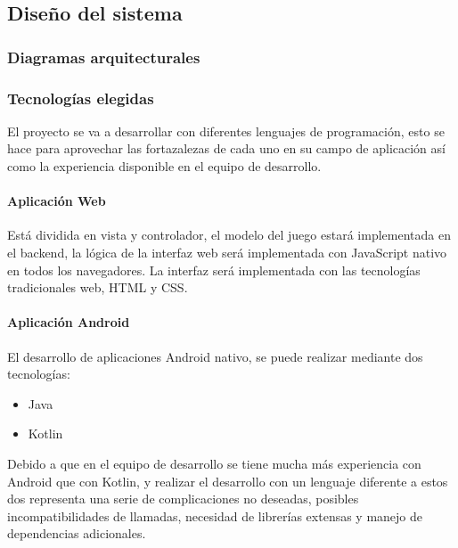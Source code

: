 \documentclass{article}
\begin{document}
\subsection{Diseño del sistema}

\subsubsection{Diagramas arquitecturales}

\subsubsection{Tecnologías elegidas}

El proyecto se va a desarrollar con diferentes lenguajes de programación, esto se hace para aprovechar las 
fortazalezas de cada uno en su campo de aplicación así como la experiencia disponible en el equipo de desarrollo.


\paragraph*{Aplicación Web}

Está dividida en vista y controlador, el modelo del juego estará implementada en el backend, 
la lógica de la interfaz web será implementada con JavaScript nativo en todos los navegadores. 
La interfaz será implementada con las tecnologías tradicionales web, HTML y CSS.

\paragraph*{Aplicación Android}
El desarrollo de aplicaciones Android nativo, se puede realizar mediante dos tecnologías:

\begin{itemize}
    \item Java
    \item Kotlin
\end{itemize}

Debido a que en el equipo de desarrollo se tiene mucha más experiencia con Android que con Kotlin, y realizar 
el desarrollo con un lenguaje diferente a estos dos representa una serie de complicaciones no deseadas, 
posibles incompatibilidades de llamadas, necesidad de librerías extensas y manejo de dependencias adicionales.
\end{document}
